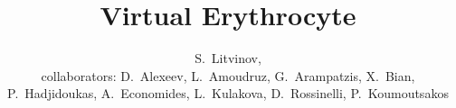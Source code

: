\author[Litvinov]
{S.~Litvinov, \\ collaborators: D.~Alexeev, L.~Amoudruz,
G.~Arampatzis, X.~Bian, P.~Hadjidoukas, A.~Economides, L.~Kulakova,
D.~Rossinelli, P.~Koumoutsakos}
\title{Virtual Erythrocyte}
\date{}
